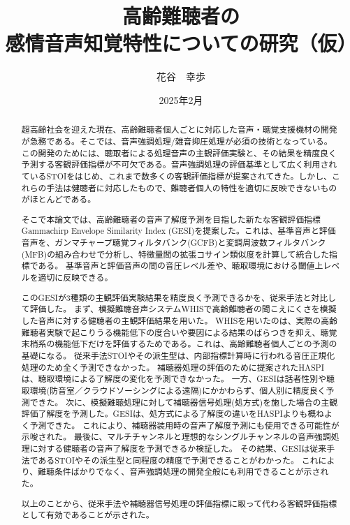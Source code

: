\documentclass[11pt]{jreport}
\title{高齢難聴者の\\感情音声知覚特性についての研究（仮）}
\author{花谷　幸歩}
\date{2025年2月}	%
\begin{document}
\maketitle



\begin{abstract}
超高齢社会を迎えた現在、高齢難聴者個人ごとに対応した音声・聴覚支援機材の開発が急務である。そこでは、音声強調処理/雑音抑圧処理が必須の技術となっている。この開発のためには、聴取者による処理音声の主観評価実験と、その結果を精度良く予測する客観評価指標が不可欠である。音声強調処理の評価基準として広く利用されているSTOIをはじめ、これまで数多くの客観評価指標が提案されてきた。しかし、これらの手法は健聴者に対応したもので、難聴者個人の特性を適切に反映できないものがほとんどである。

そこで本論文では、高齢難聴者の音声了解度予測を目指した新たな客観評価指標Gammachirp Envelope Similarity Index (GESI)を提案した。これは、基準音声と評価音声を、ガンマチャープ聴覚フィルタバンク(GCFB)と変調周波数フィルタバンク(MFB)の組み合わせで分析し、特徴量間の拡張コサイン類似度を計算して統合した指標である。
基準音声と評価音声の間の音圧レベル差や、聴取環境における閾値上レベルを適切に反映できる。

このGESIが3種類の主観評価実験結果を精度良く予測できるかを、従来手法と対比して評価した。
まず、模擬難聴音声システムWHISで高齢難聴者の聞こえにくさを模擬した音声に対する健聴者の主観評価結果を用いた。
WHISを用いたのは、実際の高齢難聴者実験で起こりうる機能低下の度合いや要因による結果のばらつきを抑え、聴覚末梢系の機能低下だけを評価するためである。これは、高齢難聴者個人ごとの予測の基礎になる。
従来手法STOIやその派生型は、内部指標計算時に行われる音圧正規化処理のため全く予測できなかった。
補聴器処理の評価のために提案されたHASPIは、聴取環境による了解度の変化を予測できなかった。
一方、GESIは話者性別や聴取環境(防音室／クラウドソーシングによる遠隔)にかかわらず、個人別に精度良く予測できた。
次に、模擬難聴処理に対して補聴器信号処理(処方式)を施した場合の主観評価了解度を予測した。GESIは、処方式による了解度の違いをHASPIよりも概ねよく予測できた。
これにより、補聴器装用時の音声了解度予測にも使用できる可能性が示唆された。
最後に、マルチチャンネルと理想的なシングルチャンネルの音声強調処理に対する健聴者の音声了解度を予測できるか検証した。
その結果、GESIは従来手法であるSTOIやその派生型と同程度の精度で予測できることがわかった。
これにより、難聴条件ばかりでなく、音声強調処理の開発全般にも利用できることが示された。

以上のことから、従来手法や補聴器信号処理の評価指標に取って代わる客観評価指標として有効であることが示された。

\end{abstract}
\end{document}
